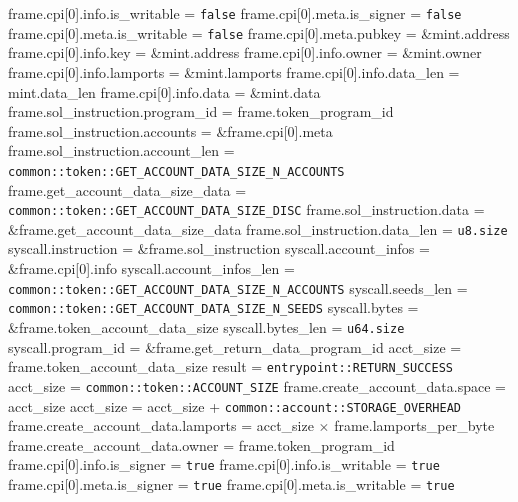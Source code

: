 \begin{algorithm}
\begin{algorithmic}
    \STATE frame.cpi[0].info.is\_writable = \texttt{false}
    \STATE frame.cpi[0].meta.is\_signer = \texttt{false}
    \STATE frame.cpi[0].meta.is\_writable = \texttt{false}
    \STATE frame.cpi[0].meta.pubkey = \&mint.address
    \STATE frame.cpi[0].info.key = \&mint.address
    \STATE frame.cpi[0].info.owner = \&mint.owner
    \STATE frame.cpi[0].info.lamports = \&mint.lamports
    \STATE frame.cpi[0].info.data\_len = mint.data\_len
    \STATE frame.cpi[0].info.data = \&mint.data
    \STATE frame.sol\_instruction.program\_id = frame.token\_program\_id
    \STATE frame.sol\_instruction.accounts = \&frame.cpi[0].meta
    \STATE frame.sol\_instruction.account\_len =
      \texttt{common::token::GET\_ACCOUNT\_DATA\_SIZE\_N\_ACCOUNTS}
    \STATE frame.get\_account\_data\_size\_data =
      \texttt{common::token::GET\_ACCOUNT\_DATA\_SIZE\_DISC}
    \STATE frame.sol\_instruction.data = \&frame.get\_account\_data\_size\_data
    \STATE frame.sol\_instruction.data\_len = \texttt{u8.size}
    \STATE syscall.instruction = \&frame.sol\_instruction
    \STATE syscall.account\_infos = \&frame.cpi[0].info
    \STATE syscall.account\_infos\_len =
      \texttt{common::token::GET\_ACCOUNT\_DATA\_SIZE\_N\_ACCOUNTS}
    \STATE syscall.seeds\_len = \texttt{common::token::GET\_ACCOUNT\_DATA\_SIZE\_N\_SEEDS}
    \STATE {}
    \STATE syscall.bytes = \&frame.token\_account\_data\_size
    \STATE syscall.bytes\_len = \texttt{u64.size}
    \STATE syscall.program\_id = \&frame.get\_return\_data\_program\_id
    \STATE {}
    \STATE acct\_size = frame.token\_account\_data\_size
    \STATE result = \texttt{entrypoint::RETURN\_SUCCESS}
  \ELSE
    \STATE acct\_size = \texttt{common::token::ACCOUNT\_SIZE}
  \ENDIF
  \STATE frame.create\_account\_data.space = acct\_size
  \STATE acct\_size = acct\_size + \texttt{common::account::STORAGE\_OVERHEAD}
  \STATE frame.create\_account\_data.lamports =
    acct\_size $\times$ frame.lamports\_per\_byte
  \STATE frame.create\_account\_data.owner = frame.token\_program\_id
  \STATE frame.cpi[0].info.is\_signer = \texttt{true}
  \STATE frame.cpi[0].info.is\_writable = \texttt{true}
  \STATE frame.cpi[0].meta.is\_signer = \texttt{true}
  \STATE frame.cpi[0].meta.is\_writable = \texttt{true}

\end{algorithmic}
\end{algorithm}
